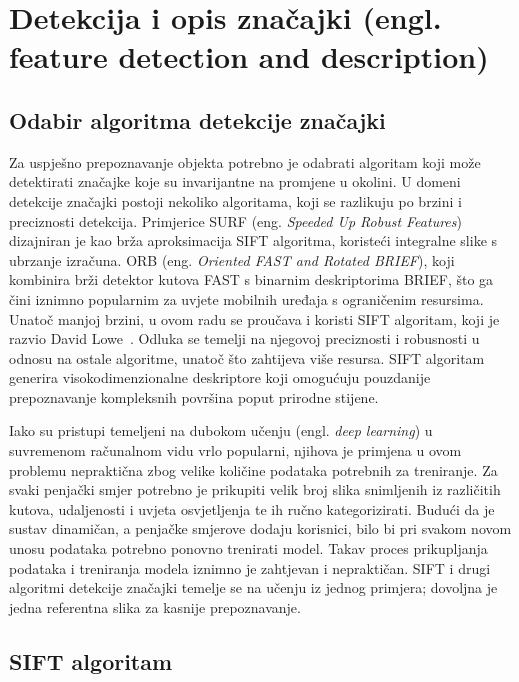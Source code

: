 \section{Detekcija i opis značajki (engl. feature detection and description)}

\subsection{Odabir algoritma detekcije značajki}

Za uspješno prepoznavanje objekta potrebno je odabrati algoritam koji može detektirati značajke koje su invarijantne na promjene u okolini. U domeni detekcije značajki postoji nekoliko algoritama, koji se razlikuju po brzini i preciznosti detekcija. Primjerice SURF (eng. \textit{Speeded Up Robust Features}) dizajniran je kao brža aproksimacija SIFT algoritma, koristeći integralne slike s ubrzanje izračuna. ORB (eng. \textit{Oriented FAST and Rotated BRIEF}), koji kombinira brži detektor kutova FAST s binarnim deskriptorima BRIEF, što ga čini iznimno popularnim za uvjete mobilnih uređaja s ograničenim resursima. Unatoč manjoj brzini, u ovom radu se proučava i koristi SIFT algoritam, koji je razvio David Lowe~\cite{lowe2004sift}. Odluka se temelji na njegovoj preciznosti i robusnosti u odnosu na ostale algoritme, unatoč što zahtijeva više resursa. SIFT algoritam generira visokodimenzionalne deskriptore koji omogućuju pouzdanije prepoznavanje kompleksnih površina poput prirodne stijene. 

Iako su pristupi temeljeni na dubokom učenju (engl. \textit{deep learning}) u suvremenom računalnom vidu vrlo popularni, njihova je primjena u ovom problemu nepraktična zbog velike količine podataka potrebnih za treniranje. Za svaki penjački smjer potrebno je prikupiti velik broj slika snimljenih iz različitih kutova, udaljenosti i uvjeta osvjetljenja te ih ručno kategorizirati. Budući da je sustav dinamičan, a penjačke smjerove dodaju korisnici, bilo bi pri svakom novom unosu podataka potrebno ponovno trenirati model. Takav proces prikupljanja podataka i treniranja modela iznimno je zahtjevan i nepraktičan. SIFT i drugi algoritmi detekcije značajki temelje se na učenju iz jednog primjera; dovoljna je jedna referentna slika za kasnije prepoznavanje. 

\subsection{SIFT algoritam}

